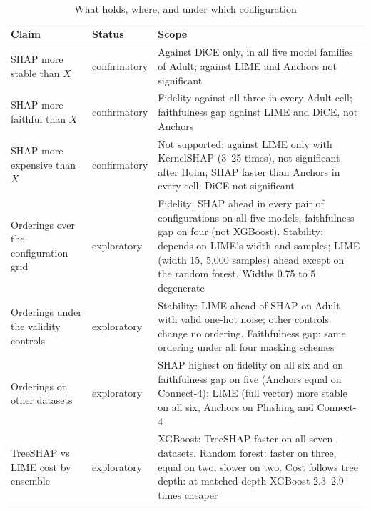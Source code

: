 \documentclass[11pt,a4paper]{article}
\begin{document}
\begin{table}[htb]
\centering
\caption{What holds, where, and under which configuration}
\label{tab:holds}
\begin{tabularx}{\linewidth}{p{3.0cm} p{2.0cm} X}
\toprule
\textbf{Claim} & \textbf{Status} & \textbf{Scope} \\
\midrule
SHAP more stable than $X$ & confirmatory & Against DiCE only, in all five model families of Adult; against LIME and Anchors not significant \\
SHAP more faithful than $X$ & confirmatory & Fidelity against all three in every Adult cell; faithfulness gap against LIME and DiCE, not Anchors \\
SHAP more expensive than $X$ & confirmatory & Not supported: against LIME only with KernelSHAP (3--25 times), not significant after Holm; SHAP faster than Anchors in every cell; DiCE not significant \\
Orderings over the configuration grid & exploratory & Fidelity: SHAP ahead in every pair of configurations on all five models; faithfulness gap on four (not XGBoost). Stability: depends on LIME's width and samples; LIME (width 15, 5,000 samples) ahead except on the random forest. Widths 0.75 to 5 degenerate \\
Orderings under the validity controls & exploratory & Stability: LIME ahead of SHAP on Adult with valid one-hot noise; other controls change no ordering. Faithfulness gap: same ordering under all four masking schemes \\
Orderings on other datasets & exploratory & SHAP highest on fidelity on all six and on faithfulness gap on five (Anchors equal on Connect-4); LIME (full vector) more stable on all six, Anchors on Phishing and Connect-4 \\
TreeSHAP vs LIME cost by ensemble & exploratory & XGBoost: TreeSHAP faster on all seven datasets. Random forest: faster on three, equal on two, slower on two. Cost follows tree depth: at matched depth XGBoost 2.3--2.9 times cheaper \\
\bottomrule
\end{tabularx}
\end{table}
\end{document}
